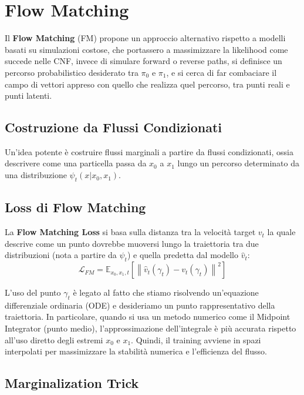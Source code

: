 \section{Flow Matching}

Il \textbf{Flow Matching} (FM) %
propone un approccio alternativo rispetto a modelli basati su simulazioni costose, che portassero a massimizzare la likelihood come succede nelle CNF, invece di simulare forward o reverse paths, si definisce un percorso probabilistico desiderato tra $\pi_0$ e $\pi_1$, e si cerca di far combaciare il campo di vettori appreso con quello che realizza quel percorso, tra punti reali e punti latenti.

\subsection{Costruzione da Flussi Condizionati}
Un'idea potente è costruire flussi marginali a partire da flussi condizionati, ossia descrivere come una particella passa da $x_0$ a $x_1$ lungo un percorso determinato da una distribuzione $\psi_t(x | x_0, x_1)$.

\subsection{Loss di Flow Matching}
La \textbf{Flow Matching Loss} si basa sulla distanza tra la velocità target $v_t$ la quale descrive come un punto dovrebbe muoversi lungo la traiettoria tra due distribuzioni (nota a partire da $\psi_t$) e quella predetta dal modello $\hat{v}_t$:
\begin{equation}
    \mathcal{L}_{FM} = \mathbb{E}_{x_0,x_1,t} \left[ \left\| \hat{v}_t(\gamma_t) - v_t(\gamma_t) \right\|^2 \right]
\end{equation}

L'uso del punto $\gamma_t$ è legato al fatto che stiamo risolvendo un'equazione differenziale ordinaria (ODE) e desideriamo un punto rappresentativo della traiettoria. In particolare, quando si usa un metodo numerico come il Midpoint Integrator (punto medio), l'approssimazione dell'integrale è più accurata rispetto all'uso diretto degli estremi $x_0$ e $x_1$. Quindi, il training avviene in spazi interpolati per massimizzare la stabilità numerica e l'efficienza del flusso.

\subsection{Marginalization Trick}

